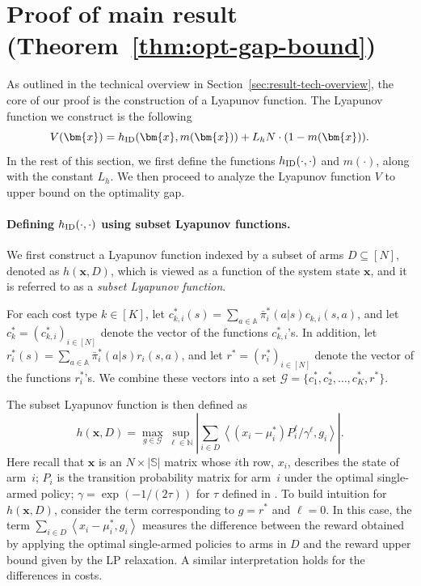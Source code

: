 \documentclass{article}
\theoremstyle{plain}
\theoremstyle{remark}
\newcommand{\abs}[1]{\left\lvert#1\right\rvert}
\newcommand{\mx}{\bm{x}}
\newcommand{\sspa}{\mathbb{S}}
\newcommand{\aspa}{\mathbb{A}}
\newcommand{\ID}{\textnormal{ID}}
\newcommand{\cardS}{\lvert\sspa\rvert}
\newcommand{\innerproduct}[2]{\left\langle #1, #2 \right\rangle}
\begin{document}
\section{Proof of main result (Theorem~\ref{thm:opt-gap-bound})}
\label{sec:proof-main}

As outlined in the technical overview in Section~\ref{sec:result-tech-overview}, the core of our proof is the construction of a Lyapunov function.
The Lyapunov function we construct is the following
\begin{equation}
    \label{eq:main-lyapunov-def}
    V(\mx) = h_{\ID}(\mx,m(\mx))+L_hN\cdot(1-m(\mx)).
\end{equation}
In the rest of this section, we first define the functions $h_{\ID}(\cdot,\cdot)$ and $m(\cdot)$, along with the constant $L_h$.
We then proceed to analyze the Lyapunov function $V$ to upper bound on the optimality gap.

\paragraph{Defining $h_{\ID}(\cdot,\cdot)$ using subset Lyapunov functions.}
We first construct a Lyapunov function indexed by a subset of arms $D\subseteq [N]$, denoted as $h(\mx,D)$, which is viewed as a function of the system state $\mx$, and it is referred to as a \emph{subset Lyapunov function}.

For each cost type $k\in[K]$, let $c_{k,i}^*(s)=\sum_{a\in\aspa} \bar{\pi}_i^*(a|s)c_{k,i}(s,a)$,
and let $c_{k}^*=(c_{k,i}^*)_{i\in[N]}$ denote the vector of the functions $c_{k,i}^*$'s.
In addition, let $r_i^*(s)=\sum_{a\in\aspa}\bar{\pi}_i^*(a|s)r_i(s,a)$,
and let $r^*=(r_i^*)_{i\in[N]}$ denote the vector of the functions $r_i^*$'s.  We combine these vectors into a set $\mathcal{G}=\{c_1^*,c_2^*,\dots,c_K^*,r^*\}$.

The subset Lyapunov function is then defined as
\begin{equation}\label{eq:h-def}
    h(\mx,D) = \max_{g\in \mathcal{G}} \sup_{\ell\in\mathbb{N}} \abs{\sum_{i\in D} \innerproduct{(x_i-\mu_i^*) P_i^{\ell} / \gamma^{\ell}}{g_i}}.
\end{equation}
Here recall that $\mx$ is an $N\times\cardS$ matrix whose $i$th row, $x_i$, describes the state of arm~$i$; $P_i$ is the transition probability matrix for arm~$i$ under the optimal single-armed policy; $\gamma = \exp(-1/(2\tau))$ for $\tau$ defined in .
To build intuition for $h(\mx,D)$, consider the term corresponding to $g=r^*$ and $\ell = 0$.
In this case, the term $\sum_{i\in D}\innerproduct{x_i-\mu_i^*}{g_i}$ measures the difference between the reward obtained by applying the optimal single-armed policies to arms in $D$ and the reward upper bound given by the LP relaxation.
A similar interpretation holds for the differences in costs.
\end{document}
